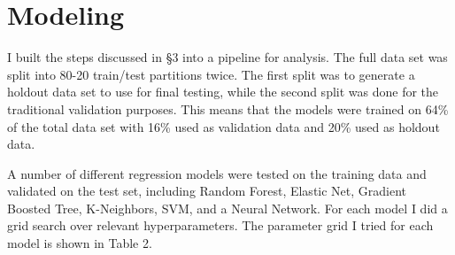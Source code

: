 \documentclass[12pt]{article}
\begin{document}
\section{Modeling}
I built the steps discussed in \S3 into a pipeline for analysis. The full data set was split into 80-20 train/test partitions twice. The first split was to generate a holdout data set to use for final testing, while the second split was done for the traditional validation purposes. This means that the models were trained on 64\% of the total data set with 16\% used as validation data and 20\% used as holdout data.

A number of different regression models were tested on the training data and validated on the test set, including Random Forest, Elastic Net, Gradient Boosted Tree, K-Neighbors, SVM, and a Neural Network. For each model I did a grid search over relevant hyperparameters. The parameter grid I tried for each model is shown in Table 2.
\end{document}
